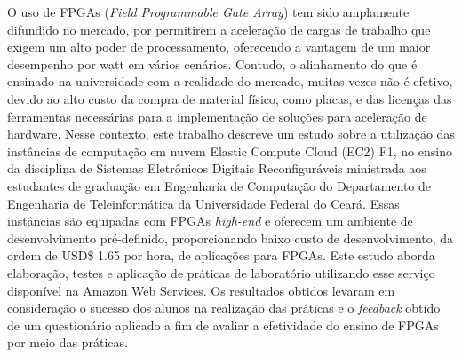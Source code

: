 O uso de FPGAs (\textit{Field Programmable Gate Array}) tem sido amplamente difundido no mercado, por permitirem  a aceleração de cargas de trabalho que exigem um alto poder de processamento, oferecendo a vantagem de um maior desempenho por watt em vários cenários. Contudo, o alinhamento do que é ensinado na universidade com a realidade do mercado, muitas vezes não é efetivo, devido ao alto custo da compra de material físico, como placas, e das licenças das ferramentas necessárias para a implementação de soluções para aceleração de hardware. Nesse contexto, este trabalho descreve um estudo sobre a utilização das instâncias de computação em nuvem Elastic Compute Cloud (EC2) F1, no ensino da disciplina de Sistemas Eletrônicos Digitais Reconfiguráveis ministrada aos estudantes de graduação em Engenharia de Computação do Departamento de Engenharia de Teleinformática da Universidade Federal do Ceará. Essas instâncias são equipadas com FPGAs \textit{high-end} e oferecem um ambiente de desenvolvimento pré-definido, proporcionando baixo custo de desenvolvimento, da ordem de USD\$ 1.65 por hora, de aplicações para FPGAs. Este estudo aborda elaboração, testes e aplicação de práticas de laboratório utilizando esse serviço disponível na Amazon Web Services. Os resultados obtidos levaram em consideração o sucesso dos alunos na realização das práticas e o \textit{feedback} obtido de um questionário aplicado a fim de avaliar a efetividade do ensino de FPGAs por meio das práticas.


